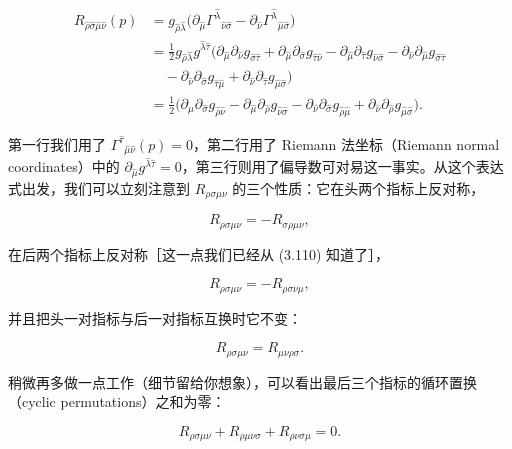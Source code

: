 \begin{align*}
R_{\hat\rho\hat\sigma\hat\mu\hat\nu}(p) &= g_{\hat\rho\hat\lambda}\big(\partial_{\hat\mu}\Gamma^{\hat\lambda}{}_{\hat\nu\hat\sigma} - \partial_{\hat\nu}\Gamma^{\hat\lambda}{}_{\hat\mu\hat\sigma}\big)\\
&= \tfrac{1}{2} g_{\hat\rho\hat\lambda} g^{\hat\lambda\hat\tau}\big(\partial_{\hat\mu}\partial_{\hat\nu}g_{\hat\sigma\hat\tau} + \partial_{\hat\mu}\partial_{\hat\sigma}g_{\hat\tau\hat\nu} - \partial_{\hat\mu}\partial_{\hat\tau}g_{\hat\nu\hat\sigma} - \partial_{\hat\nu}\partial_{\hat\mu}g_{\hat\sigma\hat\tau}\\
&\quad - \partial_{\hat\nu}\partial_{\hat\sigma}g_{\hat\tau\hat\mu} + \partial_{\hat\nu}\partial_{\hat\tau}g_{\hat\mu\hat\sigma}\big)\\
&= \tfrac{1}{2}\big(\partial_{\hat\mu}\partial_{\hat\sigma}g_{\hat\rho\hat\nu} - \partial_{\hat\mu}\partial_{\hat\rho}g_{\hat\nu\hat\sigma} - \partial_{\hat\nu}\partial_{\hat\sigma}g_{\hat\rho\hat\mu} + \partial_{\hat\nu}\partial_{\hat\rho}g_{\hat\mu\hat\sigma}\big). \tag{3.128}
\end{align*}

第一行我们用了 $\Gamma^{\hat\tau}{}_{\hat\mu\hat\nu}(p) = 0$，第二行用了 Riemann 法坐标（Riemann normal coordinates）中的 $\partial_{\hat\mu}g^{\hat\lambda\hat\tau} = 0$，第三行则用了偏导数可对易这一事实。从这个表达式出发，我们可以立刻注意到 $R_{\rho\sigma\mu\nu}$ 的三个性质：它在头两个指标上反对称，

\begin{equation*}
R_{\rho\sigma\mu\nu} = -R_{\sigma\rho\mu\nu}, \tag{3.129}
\end{equation*}

在后两个指标上反对称［这一点我们已经从 (3.110) 知道了］，

\begin{equation*}
R_{\rho\sigma\mu\nu} = -R_{\rho\sigma\nu\mu}, \tag{3.130}
\end{equation*}

并且把头一对指标与后一对指标互换时它不变：

\begin{equation*}
R_{\rho\sigma\mu\nu} = R_{\mu\nu\rho\sigma}. \tag{3.131}
\end{equation*}

稍微再多做一点工作（细节留给你想象），可以看出最后三个指标的循环置换（cyclic permutations）之和为零：

\begin{equation*}
R_{\rho\sigma\mu\nu} + R_{\rho\mu\nu\sigma} + R_{\rho\nu\sigma\mu} = 0. \tag{3.132}
\end{equation*}

